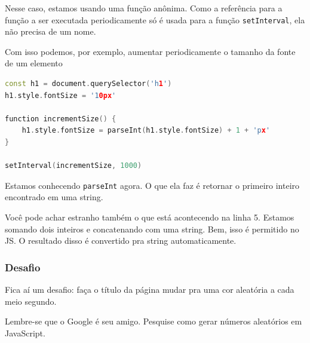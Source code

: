Nesse caso, estamos usando uma função anônima. Como a referência para a função a ser executada periodicamente só é usada para a função \texttt{setInterval}, ela não precisa de um nome.

Com isso podemos, por exemplo, aumentar periodicamente o tamanho da fonte de um elemento  \\

\begin{lstlisting}[language=C++]
const h1 = document.querySelector('h1')
h1.style.fontSize = '10px'

function incrementSize() {
    h1.style.fontSize = parseInt(h1.style.fontSize) + 1 + 'px'
}

setInterval(incrementSize, 1000)
\end{lstlisting}
\hfill

Estamos conhecendo \texttt{parseInt} agora. O que ela faz é retornar o primeiro inteiro encontrado em uma string. 

Você pode achar estranho também o que está acontecendo na linha 5. Estamos somando dois inteiros e concatenando com uma string. Bem, isso é permitido no JS. O resultado disso é convertido pra string automaticamente.




\subsubsection{Desafio}
Fica aí um desafio: faça o título da página mudar pra uma cor aleatória a cada meio segundo.

Lembre-se que o Google é seu amigo. Pesquise como gerar números aleatórios em JavaScript.